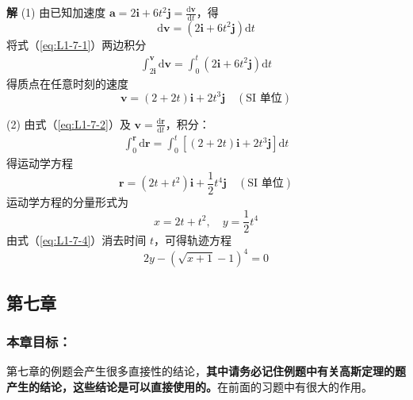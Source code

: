 \begin{enumerate}
	\textbf{解} \quad (1) 由已知加速度 $\boldsymbol{a} = 2\boldsymbol{i} + 6t^2\boldsymbol{j} = \frac{\mathrm{d}\boldsymbol{v}}{\mathrm{d}t}$，得
	\begin{equation}\label{eq:L1-7-1}
		\mathrm{d}\boldsymbol{v} = (2\boldsymbol{i} + 6t^2\boldsymbol{j})\mathrm{d}t
	\end{equation}
	将式（\ref{eq:L1-7-1}）两边积分
	\begin{align*}
		\int_{2\boldsymbol{i}}^{\boldsymbol{v}} \mathrm{d}\boldsymbol{v} = \int_{0}^{t} (2\boldsymbol{i} + 6t^2\boldsymbol{j})\mathrm{d}t
	\end{align*}
	得质点在任意时刻的速度
	\begin{equation}\label{eq:L1-7-2}
		\boldsymbol{v} = (2 + 2t)\boldsymbol{i} + 2t^3\boldsymbol{j} \quad (\text{SI 单位})
	\end{equation}
	
	(2) 由式（\ref{eq:L1-7-2}）及 $\boldsymbol{v} = \frac{\mathrm{d}\boldsymbol{r}}{\mathrm{d}t}$，积分：
	\begin{align*}
		\int_{0}^{\boldsymbol{r}} \mathrm{d}\boldsymbol{r} = \int_{0}^{t} \left[ (2 + 2t)\boldsymbol{i} + 2t^3\boldsymbol{j} \right] \mathrm{d}t
	\end{align*}
	得运动学方程
	\begin{equation}\label{eq:L1-7-3}
		\boldsymbol{r} = (2t + t^2)\boldsymbol{i} + \frac{1}{2}t^4\boldsymbol{j} \quad (\text{SI 单位})
	\end{equation}
	运动学方程的分量形式为
	\begin{equation}\label{eq:L1-7-4}
		x = 2t + t^2, \quad y = \frac{1}{2}t^4
	\end{equation}
	由式（\ref{eq:L1-7-4}）消去时间 $t$，可得轨迹方程
	\begin{equation}\label{eq:L1-7-5}
		2y - \left(\sqrt{x + 1} - 1\right)^4 = 0
	\end{equation}
	
\end{enumerate}

\subsection{第七章}

\subsubsection*{本章目标：}
第七章的例题会产生很多直接性的结论，\textbf{其中请务必记住例题中有关高斯定理的题产生的结论，这些结论是可以直接使用的。}在前面的习题中有很大的作用。

